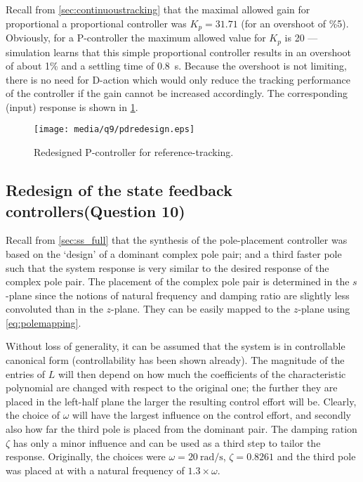 Recall from \cref{sec:continuoustracking} that the maximal allowed gain for proportional a proportional controller was $K_p = 31.71$ (for an overshoot of \%5). Obviously, for a P-controller the maximum allowed value for $K_p$ is 20 --- simulation learns that this simple proportional controller results in an overshoot of about 1\% and a settling time of \SI{0.8}{\second}. Because the overshoot is not limiting, there is no need for D-action which would only reduce the tracking performance of the controller if the gain cannot be increased accordingly. The corresponding (input) response is shown in \cref{fig:q9_pdredesign}.
\begin{figure}[ht]
    \centering
    \texttt{[image: media/q9/pdredesign.eps]}
    \caption{Redesigned P-controller for reference-tracking.}
    \label{fig:q9_pdredesign}
\end{figure}
\FloatBarrier

\subsection{Redesign of the state feedback controllers\textnormal{\phantom{xxx}(Question 10)}}
\label{sec:retunepolep}
Recall from \cref{sec:ss_full} that the synthesis of the pole-placement controller was based on the `design' of a dominant complex pole pair; and a third faster pole such that the system response is very similar to the desired response of the complex pole pair. The placement of the complex pole pair is determined in the $s$-plane since the notions of natural frequency and damping ratio are slightly less convoluted than in the $z$-plane. They can be easily mapped to the $z$-plane using \cref{eq:polemapping}.

Without loss of generality, it can be assumed that the system is in controllable canonical form (controllability has been shown already). The magnitude of the entries of $L$ will then depend on how much the coefficients of the characteristic polynomial are changed with respect to the original one; the further they are placed in the left-half plane the larger the resulting control effort will be. Clearly, the choice of $\omega$ will have the largest influence on the control effort, and secondly also how far the third pole is placed from the dominant pair. The damping ration $\zeta$ has only a minor influence and can be used as a third step to tailor the response. Originally, the choices were $\omega = \SI{20}{\radian\per\second}$, $\zeta = 0.8261$ and the third pole was placed at with a natural frequency of $1.3\times\omega$.

